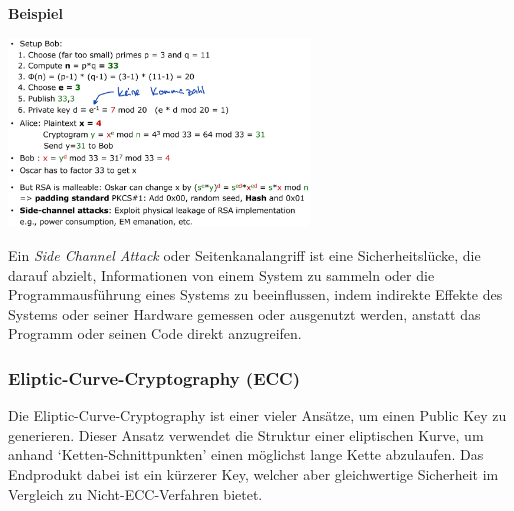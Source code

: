 \documentclass[
  10pt,
  a4paper,
]{article}
\begin{document}
\begin{multicols*}{2}
\begin{tcolorbox}[enhanced jigsaw, rightrule=.15mm, colback=white, colframe=quarto-callout-tip-color-frame, breakable, leftrule=.75mm, bottomrule=.15mm, toprule=.15mm, arc=.35mm, opacityback=0, left=2mm]
\begin{minipage}[t]{\textwidth - 5.5mm}
\vspace{-3mm}\textbf{Beispiel}\vspace{3mm}

\begin{center}
\includegraphics[width=8cm,height=\textheight]{images/crypto/image-22.png}
\end{center}

\end{minipage}%
\end{tcolorbox}

\begin{tcolorbox}[enhanced jigsaw, coltitle=black, toprule=.15mm, colframe=quarto-callout-important-color-frame, breakable, titlerule=0mm, title=\textcolor{quarto-callout-important-color}{\faExclamation}\hspace{0.5em}{Side Channel Attacks}, toptitle=1mm, colback=white, leftrule=.75mm, bottomtitle=1mm, colbacktitle=quarto-callout-important-color!10!white, left=2mm, bottomrule=.15mm, rightrule=.15mm, arc=.35mm, opacityback=0, opacitybacktitle=0.6]

Ein \emph{Side Channel Attack} oder Seitenkanalangriff ist eine
Sicherheitslücke, die darauf abzielt, Informationen von einem System zu
sammeln oder die Programmausführung eines Systems zu beeinflussen, indem
indirekte Effekte des Systems oder seiner Hardware gemessen oder
ausgenutzt werden, anstatt das Programm oder seinen Code direkt
anzugreifen.

\end{tcolorbox}

\subsubsection{Eliptic-Curve-Cryptography
(ECC)}\label{eliptic-curve-cryptography-ecc}

Die Eliptic-Curve-Cryptography ist einer vieler Ansätze, um einen Public
Key zu generieren. Dieser Ansatz verwendet die Struktur einer
eliptischen Kurve, um anhand `Ketten-Schnittpunkten' einen möglichst
lange Kette abzulaufen. Das Endprodukt dabei ist ein kürzerer Key,
welcher aber gleichwertige Sicherheit im Vergleich zu
Nicht-ECC-Verfahren bietet.


\end{multicols*}
\end{document}
